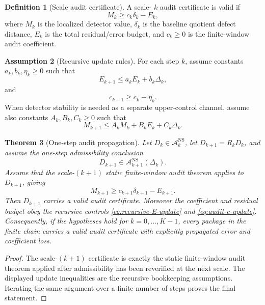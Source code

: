 \documentclass[11pt]{article}
\numberwithin{equation}{section}
\theoremstyle{plain}
\newtheorem{theorem}{Theorem}[section]
\theoremstyle{definition}
\newtheorem{definition}[theorem]{Definition}
\newtheorem{assumption}[theorem]{Assumption}
\theoremstyle{remark}
\newcommand{\NS}{\mathrm{NS}}
\newcommand{\A}{\mathcal A}
\begin{document}
\begin{definition}[Scale audit certificate]\label{def:scale-audit-certificate}
A scale-
\(k\) audit certificate is valid if
\begin{equation}\label{eq:scale-audit-cert}
  M_k\ge c_k\delta_k-E_k,
\end{equation}
where \(M_k\) is the localized detector value, \(\delta_k\) is the baseline quotient defect distance, \(E_k\) is the total residual/error budget, and \(c_k\ge0\) is the finite-window audit coefficient.
\end{definition}

\begin{assumption}[Recursive update rules]\label{ass:recursive-update-rules}
For each step \(k\), assume constants \(a_k,b_k,\eta_k\ge0\) such that
\begin{equation}\label{eq:recursive-E-update}
  E_{k+1}\le a_kE_k+b_k\Delta_k,
\end{equation}
and
\begin{equation}\label{eq:audit-c-update}
  c_{k+1}\ge c_k-\eta_k.
\end{equation}
When detector stability is needed as a separate upper-control channel, assume also constants \(A_k,B_k,C_k\ge0\) such that
\begin{equation}\label{eq:audit-M-stability}
  M_{k+1}\le A_kM_k+B_kE_k+C_k\Delta_k.
\end{equation}
\end{assumption}

\begin{theorem}[One-step audit propagation]\label{thm:one-step-audit-propagation}
Let \(D_k\in\A_k^{\NS}\), let \(D_{k+1}=R_kD_k\), and assume the one-step admissibility conclusion
\[
  D_{k+1}\in\A_{k+1}^{\NS}(\Delta_k).
\]
Assume that the scale-\((k+1)\) static finite-window audit theorem applies to \(D_{k+1}\), giving
\[
  M_{k+1}\ge c_{k+1}\delta_{k+1}-E_{k+1}.
\]
Then \(D_{k+1}\) carries a valid audit certificate.  Moreover the coefficient and residual budget obey the recursive controls \eqref{eq:recursive-E-update} and \eqref{eq:audit-c-update}.  Consequently, if the hypotheses hold for \(k=0,\ldots,K-1\), every package in the finite chain carries a valid audit certificate with explicitly propagated error and coefficient loss.
\end{theorem}

\begin{proof}
The scale-\((k+1)\) certificate is exactly the static finite-window audit theorem applied after admissibility has been reverified at the next scale.  The displayed update inequalities are the recursive bookkeeping assumptions.  Iterating the same argument over a finite number of steps proves the final statement.
\end{proof}
\end{document}
